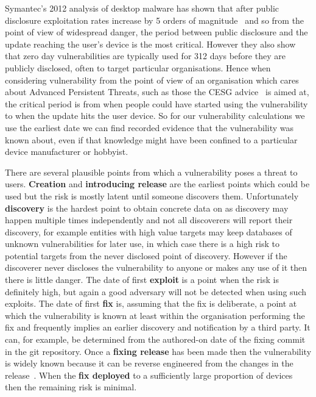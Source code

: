 \documentclass[conference,a4paper,twoside]{IEEEtran}
\begin{document}
Symantec's 2012 analysis of desktop malware has shown that after public disclosure exploitation rates increase by 5 orders of magnitude~\cite{Bilge2012} and so from the point of view of widespread danger, the period between public disclosure and the update reaching the user's device is the most critical.
However they also show that zero day vulnerabilities are typically used for 312 days before they are publicly disclosed, often to target particular organisations.
Hence when considering vulnerability from the point of view of an organisation which cares about Advanced Persistent Threats, such as those the CESG advice~\cite{CESG2013} is aimed at, the critical period is from when people could have started using the vulnerability to when the update hits the user device.
So for our vulnerability calculations we use the earliest date we can find recorded evidence that the vulnerability was known about, even if that knowledge might have been confined to a particular device manufacturer or hobbyist.

There are several plausible points from which a vulnerability poses a threat to users.
{\bf Creation} and {\bf introducing release} are the earliest points which could be used but the risk is mostly latent until someone discovers them.
Unfortunately {\bf discovery} is the hardest point to obtain concrete data on as discovery may happen multiple times independently and not all discoverers will report their discovery, for example entities with high value targets may keep databases of unknown vulnerabilities for later use, in which case there is a high risk to potential targets from the never disclosed point of discovery.
However if the discoverer never discloses the vulnerability to anyone or makes any use of it then there is little danger.
The date of first {\bf exploit} is a point when the risk is definitely high, but again a good adversary will not be detected when using such exploits.
The date of first {\bf fix} is, assuming that the fix is deliberate, a point at which the vulnerability is known at least within the organisation performing the fix and frequently implies an earlier discovery and notification by a third party.
It can, for example, be determined from the authored-on date of the fixing commit in the git repository.
Once a {\bf fixing release} has been made then the vulnerability is widely known because it can be reverse engineered from the changes in the release~\cite{Brumley2008}.
When the {\bf fix deployed} to a sufficiently large proportion of devices then the remaining risk is minimal.
\end{document}
